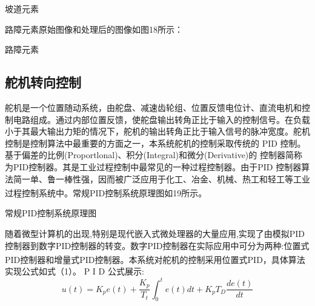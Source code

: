 \documentclass{article}%
\begin{document}
\begin{multicols}{2}
\begin{center}
			\caption{坡道元素}		
		\end{center}
		路障元素原始图像和处理后的图像如图18所示：
		\begin{center}
			\caption{路障元素}		
		\end{center}
		
		\subsection{舵机转向控制}
		
		舵机是一个位置随动系统，由舵盘、减速齿轮组、位置反馈电位计、直流电机和控制电路组成。通过内部位置反馈，使舵盘输出转角正比于输入的控制信号。在负载小于其最大输出力矩的情况下，舵机的输出转角正比于输入信号的脉冲宽度。舵机控制是控制算法中最重要的方面之一，本系统舵机的控制采取传统的 PID 控制。基于偏差的比例(Proportlonal)、积分(Integral)和微分(Derivative)的 控制器简称为PID控制器。其是工业过程控制中最常见的一种过程控制器。由于PID 控制器算法简一单、鲁一棒性强，因而被广泛应用于化工、冶金、机械、热工和轻工等工业过程控制系统中\textsuperscript{\cite{ref7}}。常规PID控制系统原理图如19所示。
		
		\begin{center}
			\caption{常规PID控制系统原理图}		
		\end{center}

		随着微型计算机的出现,特别是现代嵌入式微处理器的大量应用,实现了由模拟PID控制器到数字PID控制器的转变。数字PID控制器在实际应用中可分为两种:位置式PID控制器和增量式PID控制器\textsuperscript{\cite{ref7}}。本系统对舵机的控制采用位置式PID，具体算法实现公式如式（1）。
		 P I D  公式展示:
		\begin{equation}
			u(t)=K_{p} e(t)+\frac{K_{p}}{T_{t}} \int_{0}^{t} e(t) d t+K_{p} T_{D} \frac{d e(t)}{d t}
		\end{equation}		
		

\end{multicols}
\end{document}
